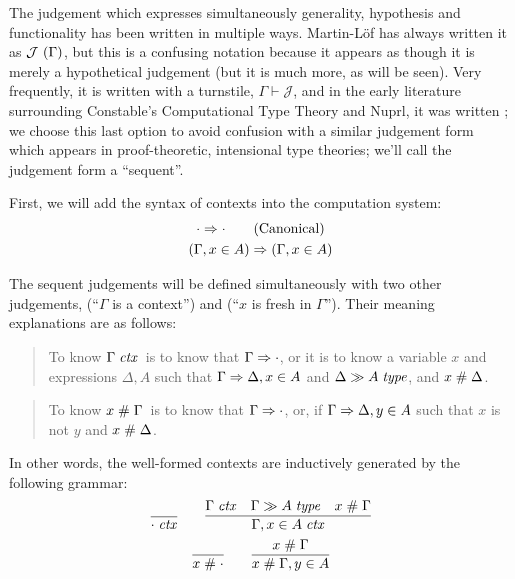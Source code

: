 \documentclass[main.tex]{subfiles}
\begin{document}
The judgement which expresses simultaneously generality, hypothesis and
functionality has been written in multiple ways. Martin-L\"of has always
written it as $\mathcal{J}\ (\Gamma)$, but this is a confusing notation
because it appears as though it is merely a hypothetical judgement (but it is
much more, as will be seen). Very frequently, it is written with a turnstile,
$\Gamma\vdash\mathcal{J}$, and in the early literature surrounding Constable's
Computational Type Theory and Nuprl, it was written
; we choose this last option to avoid
confusion with a similar judgement form which appears in proof-theoretic,
intensional type theories; we'll call the judgement form a ``sequent''.

First, we will add the syntax of contexts into the computation system:
\begin{gather*}
  \cdot\Rightarrow\cdot\tag{Canonical}\\
  (\Gamma,x\in A)\Rightarrow(\Gamma,x\in A)
\end{gather*}

The sequent judgements will be defined simultaneously with two other
judgements, \framebox{$\isctx{\Gamma}$} (``$\Gamma$ is a context'')
and  (``$x$ is fresh in
$\Gamma$''). Their meaning explanations are as follows:

\begin{quote}
  To know $\Gamma\;\mathit{ctx}$\ is to know that $\Gamma\Rightarrow\cdot$, or it is to know
  a variable $x$ and expressions $\Delta,A$ such that $\Gamma\Rightarrow\Delta, x\in A$
  and $\Delta\gg A\;\mathit{type}$, and $x\mathrel{\#}\Delta$.
\end{quote}

\begin{quote}
  To know $x\mathrel{\#}\Gamma$\ is to know that
  $\Gamma\Rightarrow\cdot$, or, if $\Gamma\Rightarrow\Delta,y\in A$
  such that $x$ is not $y$ and $x\mathrel{\#}\Delta$.
\end{quote}

In other words, the well-formed contexts are inductively generated by the
following grammar:
\begin{gather*}
  \infer{\isctx\cdot}{}
  \qquad
  \infer{
    \isctx{\Gamma,\ver{x}{A}}
  }{
    \isctx\Gamma &
    \sequent{\Gamma}{\isset{A}} &
    \fresh{x}{\Gamma}
  }\\
  \infer{\fresh{x}{\cdot}}{}
  \qquad
  \infer{
    \fresh{x}{\Gamma,\ver{y}{A}}
  }{
    \fresh{x}{\Gamma}
  }
\end{gather*}
\end{document}
